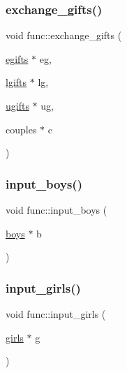 \subsubsection{\texorpdfstring{exchange\+\_\+gifts()}{exchange\_gifts()}}
{\footnotesize\ttfamily void func\+::exchange\+\_\+gifts (\begin{DoxyParamCaption}\item[{\hyperlink{classinfo_1_1egifts}{egifts} $\ast$}]{eg,  }\item[{\hyperlink{classinfo_1_1lgifts}{lgifts} $\ast$}]{lg,  }\item[{\hyperlink{classinfo_1_1ugifts}{ugifts} $\ast$}]{ug,  }\item[{couples $\ast$}]{c }\end{DoxyParamCaption})}

\mbox{\label{namespacefunc_abd34b28971356ea1d2ac2c5ff2b15cc8}} 
\subsubsection{\texorpdfstring{input\+\_\+boys()}{input\_boys()}}
{\footnotesize\ttfamily void func\+::input\+\_\+boys (\begin{DoxyParamCaption}\item[{\hyperlink{classinfo_1_1boys}{boys} $\ast$}]{b }\end{DoxyParamCaption})}

\mbox{\label{namespacefunc_ae1456c47a6125b2cbed9a6d4e6a95296}} 
\subsubsection{\texorpdfstring{input\+\_\+girls()}{input\_girls()}}
{\footnotesize\ttfamily void func\+::input\+\_\+girls (\begin{DoxyParamCaption}\item[{\hyperlink{classinfo_1_1girls}{girls} $\ast$}]{g }\end{DoxyParamCaption})}

\mbox{\label{namespacefunc_a5bdfb340927de98cb50c3527ae2da0c6}} 
